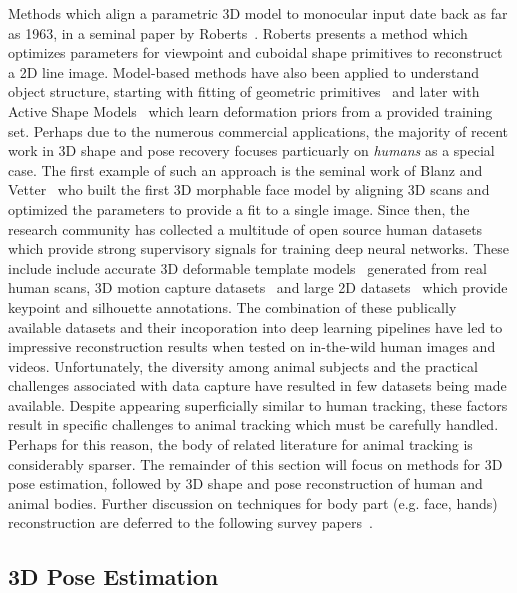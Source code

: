     Methods which align a parametric 3D model to monocular input date back as far as 1963, in a seminal paper by Roberts~\cite{xxx}. Roberts presents a method which optimizes parameters for viewpoint and cuboidal shape primitives to reconstruct a 2D line image. Model-based methods have also been applied to understand object structure, starting with fitting of geometric primitives~\cite{xxx} and later with Active Shape Models~\cite{xxx} which learn deformation priors from a provided training set. Perhaps due to the numerous commercial applications, the majority of recent work in 3D shape and pose recovery focuses particuarly on \emph{humans} as a special case. The first example of such an approach is the seminal work of Blanz and Vetter~\cite{blanz-vetter} who built the first 3D morphable face model by aligning 3D scans and optimized the parameters to provide a fit to a single image. Since then, the research community has collected a multitude of open source human datasets which provide strong supervisory signals for training deep neural networks. These include include accurate 3D deformable template models~\cite{loper15smpl} generated from real human scans, 3D motion capture datasets~\cite{ionescu2013human3,vonmarcard2018recovering} and large 2D datasets~\cite{lin2014microsoft,johnson2010clustered,andriluka14cvpr} which provide keypoint and silhouette annotations. The combination of these publically available datasets and their incoporation into deep learning pipelines have led to impressive reconstruction results when tested on in-the-wild human images and videos. Unfortunately, the diversity among animal subjects and the practical challenges associated with data capture have resulted in few datasets being made available. Despite appearing superficially similar to human tracking, these factors result in specific challenges to animal tracking which must be carefully handled. Perhaps for this reason, the body of related literature for animal tracking is considerably sparser. The remainder of this section will focus on methods for 3D pose estimation, followed by 3D shape and pose reconstruction of human and animal bodies. Further discussion on techniques for body part (e.g. face, hands) reconstruction are deferred to the following survey papers~\cite{xxx, xxx}.

\subsection{3D Pose Estimation}


